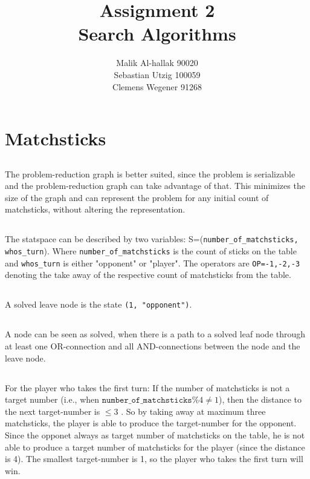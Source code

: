 \documentclass[11pt]{article}
\title{\textbf{Assignment 2\\}Search Algorithms}
\author{Malik Al-hallak 90020\\
		Sebastian Utzig 100059\\
		Clemens Wegener 91268}
\date{}
\begin{document}
\maketitle

\section{Matchsticks}
\subsection{}
The problem-reduction graph is better suited, since the problem is serializable and the problem-reduction graph can take advantage of that. This minimizes the size of the graph and can represent the problem for any initial count of matchsticks, without altering the representation.

\subsection{}
The statspace can be described by two variables: S=(\texttt{number\_of\_matchsticks, whos\_turn}).
Where \texttt{number\_of\_matchsticks} is the count of sticks on the table and \texttt{whos\_turn} is either "opponent" or "player". The operators are \texttt{OP={-1,-2,-3}} denoting the take away of the respective count of matchsticks from the table.

\subsection{}
A solved leave node is the state \texttt{(1, "opponent")}.

\subsection{}
A node can be seen as solved, when there is a path to a solved leaf node through at least one OR-connection and all AND-connections between the node and the leave node.

\subsection{}
For the player who takes the first turn: If the number of matchsticks is not a target number (i.e., when $\texttt{number\_of\_matchsticks} \% 4 \neq 1$), then the distance to the next target-number is $\leq3$ . So by taking away at maximum three matchsticks, the player is able to produce the target-number for the opponent. Since the opponet always as  target number of matchsticks on the table, he is not able to produce a target number of matchsticks for the player (since the distance is 4).
The smallest target-number is 1, so the player who takes the first turn will win.
\end{document}
